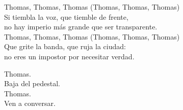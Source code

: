 \begin{lyrics}
Thomas, Thomas, Thomas
(Thomas, Thomas, Thomas)\\
Si tiembla la voz, que tiemble de frente,\\
no hay imperio más grande que ser transparente.\\
Thomas, Thomas, Thomas
(Thomas, Thomas, Thomas)\\
Que grite la banda, que ruja la ciudad:\\
no eres un impostor por necesitar verdad.

Thomas.\\
Baja del pedestal.\\
Thomas.\\
Ven a conversar.
\end{lyrics}


